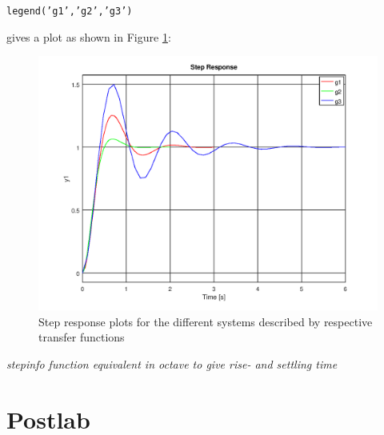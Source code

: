 \documentclass[a4paper, 12pt]{article}
\begin{document}
		\texttt{legend('g1','g2','g3')}



		gives a plot as shown in Figure \ref{plot_question_2_lab}:

		\begin{figure}[H]
			\includegraphics[width=\textwidth]{img/Question_2_Lab_Plots.png}
			\caption{Step response plots for the different systems described by respective transfer functions}
			\label{plot_question_2_lab}
		\end{figure}

		\textit{stepinfo function equivalent in octave to give rise- and settling time}


	\section{Postlab} %
	\label{sec:postlab}
		
\end{document}
